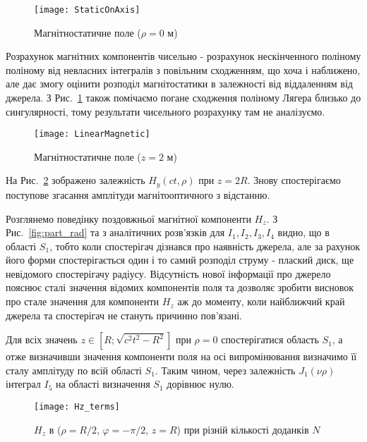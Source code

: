 \begin{figure}[h] \begin{center}
\texttt{[image: StaticOnAxis]}
\caption{Магнітностатичне поле ($ \rho = 0 $ м)} \label{fig:emp_h_z}
\end{center} \end{figure}

Розрахунок магнітних компонентів чисельно - розрахунок нескінченного 
поліному поліному від невласних інтегралів з повільним сходженням, що
хоча і наближено, але дає змогу оцінити розподіл магнітостатики в 
залежності від віддаленням від джерела. З Рис.~\ref{fig:emp_h_z} також 
помічаємо погане сходження поліному Лягера близько до сингулярності, тому 
результати чисельного розрахунку там не аналізуємо.

\begin{figure}[h] \begin{center}
\texttt{[image: LinearMagnetic]}
\caption{Магнітностатичне поле ($ z = 2 $ м)} \label{fig:emp_h_rho}
\end{center} \end{figure}

На Рис.~\ref{fig:emp_h_rho} зображено залежність $ H_y (ct,\rho) $ при 
$ z = 2R $. Знову спостерігаємо поступове згасання амплітуди 
магнітооптичного з відстанню.

Розглянемо поведінку поздовжньої магнітної компоненти $ H_z $. З 
Рис.~\ref{fig:part_rad} та з аналітичних розв'язків для 
$ I_1, I_2, I_3, I_4 $ видно, що в області $ S_1 $, тобто коли 
спостерігач дізнався про наявність джерела, але за рахунок його форми
спостерігається один і то самий розподіл струму - плаский диск, ще 
невідомого спостерігачу радіусу. Відсутність нової інформації про 
джерело пояснює сталі значення відомих компонентів поля та дозволяє
зробити висновок про стале значення для компоненти $ H_z $ аж до 
моменту, коли найближчий край джерела та спостерігач не стануть 
причинно пов'язані.

Для всіх значень $ z \in \left[ R; \sqrt{c^2t^2-R^2} \right] $ при 
$ \rho = 0 $ спостерігатися область $ S_1 $, а отже визначивши значення 
компоненти поля на осі випромінювання визначимо її сталу амплітуду
по всій області $ S_1 $. Таким чином, через залежність 
$ J_1 (\nu \rho) $ інтеграл $ I_5 $ на області визначення $ S_1 $ 
дорівнює нулю.

\begin{figure}[h] \begin{center}
\texttt{[image: Hz\_terms]}
\caption{$H_z$ в ($\rho = R/2$, $\varphi = -\pi/2$, $z = R$) при 
різній кількості доданків $ N $} \label{fig:hz_terms}
\end{center} \end{figure}


